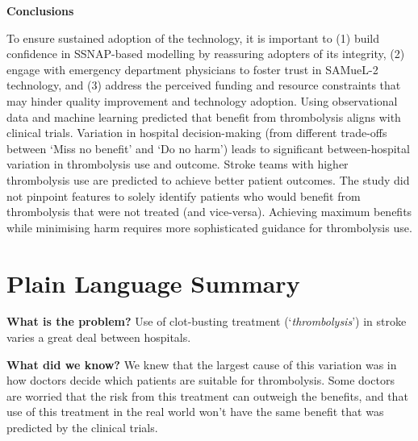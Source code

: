\textbf{Conclusions}

To ensure sustained adoption of the technology, it is important to (1) build confidence in SSNAP-based modelling by reassuring adopters of its integrity, (2) engage with emergency department physicians to foster trust in SAMueL-2 technology, and (3) address the perceived funding and resource constraints that may hinder quality improvement and technology adoption. Using observational data and machine learning predicted that benefit from thrombolysis aligns with clinical trials. Variation in hospital decision-making (from different trade-offs between ‘Miss no benefit’ and ‘Do no harm’) leads to significant between-hospital variation in thrombolysis use and outcome. Stroke teams with higher thrombolysis use are predicted to achieve better patient outcomes. The study did not pinpoint features to solely identify patients who would benefit from thrombolysis that were not treated (and vice-versa). Achieving maximum benefits while minimising harm requires more sophisticated guidance for thrombolysis use.



\section*{Plain Language Summary}

\textbf{What is the problem?} Use of clot-busting treatment (`\textit{thrombolysis}') in stroke varies a great deal between hospitals.

\textbf{What did we know?} We knew that the largest cause of this variation was in how doctors decide which patients are suitable for thrombolysis. Some doctors are worried that the risk from this treatment can outweigh the benefits, and that use of this treatment in the real world won’t have the same benefit that was predicted by the clinical trials.

